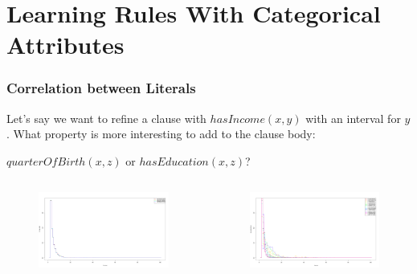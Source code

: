 \documentclass{beamer}
\begin{document}
\section{Learning Rules With Categorical Attributes}

\begin{frame}
\frametitle{Correlation between Literals}
Let's say we want to refine a clause with $hasIncome(x,y)$ with an interval for $y$.
What property is more interesting to add to the clause body: 
  \begin{center}
   $quarterOfBirth(x,z)$ or $hasEducation(x,z)$?
  \end{center}
\begin{columns}[c]
    \begin{figure}
    \includegraphics[width=1\linewidth]{./Figures/income-birthquarter.png}
    \end{figure}
    \begin{figure}
    \includegraphics[width=1\linewidth]{./Figures/income-education.png}
    \end{figure}
\end{columns}
\end{frame}
\end{document}
